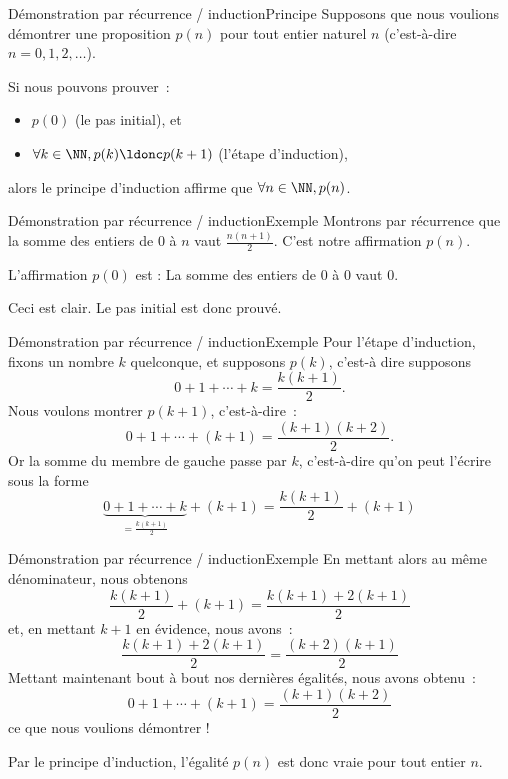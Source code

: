 \begin{frame}{Démonstration par récurrence / induction}{Principe}
  Supposons que nous voulions démontrer une proposition \(p(n)\) pour tout entier naturel \(n\) (c'est-à-dire \(n = 0, 1, 2, \ldots\)).

  Si nous pouvons prouver~:
  \begin{itemize}
  \item \(p(0)\) (\og le pas initial\fg{}), et
  \item \(\forall k\in \NN, p(k) \ldonc p(k+1)\) (\og l'étape d'induction\fg{}),
  \end{itemize}
  alors le principe d'induction affirme que \(\forall n\in \NN, p(n)\).
\end{frame}
\begin{frame}{Démonstration par récurrence / induction}{Exemple}
  Montrons par récurrence que la somme des entiers de \(0\) à \(n\) vaut \(\frac{n(n+1)}{2}\). C'est notre affirmation \(p(n)\).

  L'affirmation \(p(0)\) est : \og La somme des entiers de \(0\) à \(0\) vaut \(0\).\fg{} \pause

  Ceci est clair. Le pas initial est donc prouvé.\pause
\end{frame}
\begin{frame}{Démonstration par récurrence / induction}{Exemple}
  Pour l'étape d'induction, fixons un nombre \(k\) quelconque, et supposons \(p(k)\), c'est-à dire supposons\pause
  \begin{equation*}
    0 + 1 + \cdots + k = \frac{k(k+1)}{2}.
  \end{equation*}\pause
  Nous voulons montrer \(p(k+1)\), c'est-à-dire~:
  \begin{equation*}
    0 + 1 + \cdots + (k+1) = \frac{(k+1)(k+2)}{2}.
  \end{equation*}\pause
  Or la somme du membre de gauche \og passe\fg{} par \(k\), c'est-à-dire qu'on peut l'écrire sous la forme
  \begin{equation*}
    \underbrace{0 + 1 + \cdots + k}_{= \frac{k(k+1)}{2}} + (k+1) = \frac{k(k+1)}{2} + (k+1)
  \end{equation*}\pause
\end{frame}
\begin{frame}{Démonstration par récurrence / induction}{Exemple}
  En mettant alors au même dénominateur, nous obtenons
  \begin{equation*}
    \frac{k(k+1)}{2} + (k+1) = \frac{k(k+1)+2(k+1)}{2}
  \end{equation*}\pause
  et, en mettant \(k+1\) en évidence, nous avons~:
  \begin{equation*}
    \frac{k(k+1)+2(k+1)}{2} = 
    \frac{(k+2)(k+1)}{2}
  \end{equation*}\pause
  Mettant maintenant bout à bout nos dernières égalités, nous avons obtenu~:
  \begin{equation*}
    0 + 1 + \cdots + (k+1) = \frac{(k+1)(k+2)}{2}
  \end{equation*}
  ce que nous voulions démontrer !\pause

  Par le principe d'induction, l'égalité \(p(n)\) est donc vraie pour tout entier \(n\).
\end{frame}


